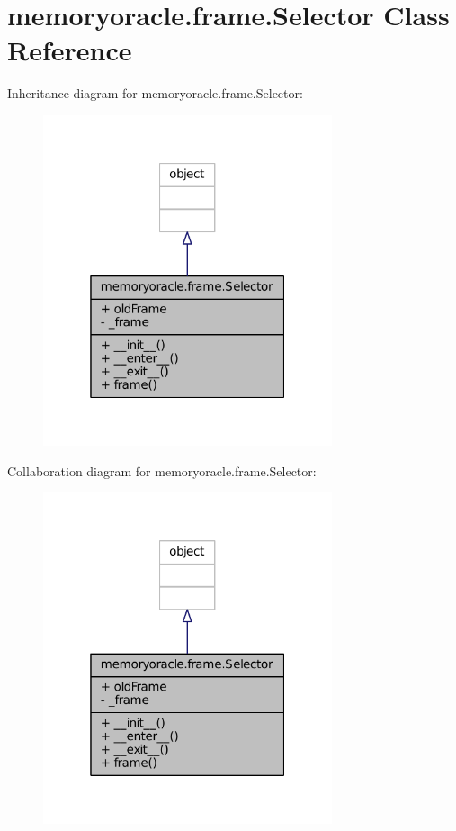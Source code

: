 \hypertarget{classmemoryoracle_1_1frame_1_1Selector}{}\section{memoryoracle.\+frame.\+Selector Class Reference}
\label{classmemoryoracle_1_1frame_1_1Selector}


Inheritance diagram for memoryoracle.\+frame.\+Selector\+:
\nopagebreak
\begin{figure}[H]
\begin{center}
\leavevmode
\includegraphics[width=241pt]{classmemoryoracle_1_1frame_1_1Selector__inherit__graph}
\end{center}
\end{figure}


Collaboration diagram for memoryoracle.\+frame.\+Selector\+:
\nopagebreak
\begin{figure}[H]
\begin{center}
\leavevmode
\includegraphics[width=241pt]{classmemoryoracle_1_1frame_1_1Selector__coll__graph}
\end{center}
\end{figure}
